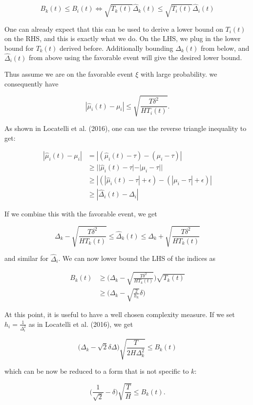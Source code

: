 \documentclass[11pt,]{article}
\begin{document}
\[
B_k(t) \leq B_i(t) \Leftrightarrow \sqrt{T_k(t)}\hat{\Delta}_k(t) \leq \sqrt{T_i(t)} \hat{\Delta}_i(t)
\]

One can already expect that this can be used to derive a lower bound on
\(T_i(t)\) on the RHS, and this is exactly what we do. On the LHS, we
plug in the lower bound for \(T_k(t)\) derived before. Additionally
bounding \(\Delta_k(t)\) from below, and \(\hat{\Delta}_i(t)\) from
above using the favorable event will give the desired lower bound.

Thus assume we are on the favorable event \(\xi\) with large
probability. we consequently have

\[
| \hat{\mu}_i(t) - \mu_i| \leq \sqrt{\frac{T\delta^2}{HT_i(t)}}.
\]

As shown in Locatelli et al. (2016), one can use the reverse triangle
inequality to get:

\begin{align*}
|\hat{\mu}_i(t) - \mu_i| & = |(\hat{\mu}_i(t) - \tau) - (\mu_i - \tau)| \\
& \geq || \hat{\mu}_i(t) - \tau | - |\mu_i - \tau|| \\
& \geq |(|\hat{\mu}_i(t) - \tau| + \epsilon) - (|\mu_i - \tau| + \epsilon)| \\
& \geq |\hat{\Delta}_i(t) - \Delta_i|
\end{align*}

If we combine this with the favorable event, we get

\[
\Delta_k - \sqrt{\frac{T\delta^2}{HT_k(t)}} \leq \hat{\Delta}_k(t) \leq \Delta_k + \sqrt{\frac{T\delta^2}{HT_k(t)}}
\]

and similar for \(\hat{\Delta}_i\). We can now lower bound the LHS of
the indices as

\begin{align*}
B_k(t) & \geq \Big(\Delta_k - \sqrt{\frac{T\delta^2}{HT_k(t)}}\Big) \sqrt{T_k(t)} \\
& \geq \Big(\Delta_k - \sqrt{\frac{2}{h_k}}\delta \Big)
\end{align*}

At this point, it is useful to have a well chosen complexity measure. If
we set \(h_i = \frac{1}{\Delta_i^2}\) as in Locatelli et al. (2016), we
get

\[
\Big(\Delta_k - \sqrt{2}\delta \Delta \Big) \sqrt{\frac{T}{2H\Delta_k^2}} \leq B_k(t)
\]

which can be now be reduced to a form that is not specific to \(k\):

\[
\Big( \frac{1}{\sqrt{2}} - \delta \Big) \sqrt{\frac{T}{H}} \leq B_k(t).
\]
\end{document}
